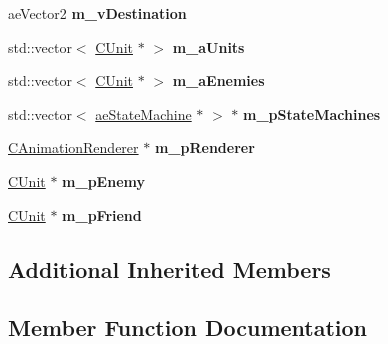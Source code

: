 \begin{DoxyCompactItemize}
\item 
ae\+Vector2 {\bfseries m\+\_\+v\+Destination}\hypertarget{class_c_unit_a2b1f832849cabe95c3df784a221e7159}{}\label{class_c_unit_a2b1f832849cabe95c3df784a221e7159}

\item 
std\+::vector$<$ \hyperlink{class_c_unit}{C\+Unit} $\ast$ $>$ {\bfseries m\+\_\+a\+Units}\hypertarget{class_c_unit_a9aaee699a591a993100a8fbf89d3cf42}{}\label{class_c_unit_a9aaee699a591a993100a8fbf89d3cf42}

\item 
std\+::vector$<$ \hyperlink{class_c_unit}{C\+Unit} $\ast$ $>$ {\bfseries m\+\_\+a\+Enemies}\hypertarget{class_c_unit_a8e4e45d2e21d84f007cad5a54abe104e}{}\label{class_c_unit_a8e4e45d2e21d84f007cad5a54abe104e}

\item 
std\+::vector$<$ \hyperlink{classae_state_machine}{ae\+State\+Machine} $\ast$ $>$ $\ast$ {\bfseries m\+\_\+p\+State\+Machines}\hypertarget{class_c_unit_a7817e8f9d69101be377cc11d4b5eb97e}{}\label{class_c_unit_a7817e8f9d69101be377cc11d4b5eb97e}

\item 
\hyperlink{class_c_animation_renderer}{C\+Animation\+Renderer} $\ast$ {\bfseries m\+\_\+p\+Renderer}\hypertarget{class_c_unit_a201bc2b6370b906d4f594aae06cf7ab7}{}\label{class_c_unit_a201bc2b6370b906d4f594aae06cf7ab7}

\item 
\hyperlink{class_c_unit}{C\+Unit} $\ast$ {\bfseries m\+\_\+p\+Enemy}\hypertarget{class_c_unit_a84e2aece711dc1f5f04f1192108c93fd}{}\label{class_c_unit_a84e2aece711dc1f5f04f1192108c93fd}

\item 
\hyperlink{class_c_unit}{C\+Unit} $\ast$ {\bfseries m\+\_\+p\+Friend}\hypertarget{class_c_unit_a53e15ad7257e6778dc28988d694628d6}{}\label{class_c_unit_a53e15ad7257e6778dc28988d694628d6}

\end{DoxyCompactItemize}
\subsection*{Additional Inherited Members}


\subsection{Member Function Documentation}
